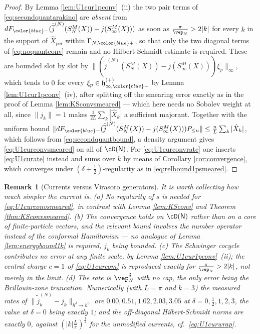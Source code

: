 \documentclass[a4paper, 11pt]{article}
\newcommand{\fh}{\mathfrak{h}}
\DeclareMathOperator{\1}{\mathds{1}}
\DeclareMathOperator{\per}{per}
\newtheorem{rem}[thm]{Remark}
\newcommand{\Nop}{\mathsf{N}}
\begin{document}
\begin{proof}
By Lemma \ref{lem:U1cur1pconv}\!\ (ii) the two pair terms of \eqref{eq:secondquantarakino} are \emph{absent} from $dF_{{\color{blue}-}}(\tilde{\overline{j}}^{(N)}(S^{M}_{N}(X))-j(S^{M}_{\infty}(X)))$ as soon as $\tfrac{\pi}{\vep_{N}}>2|k|$ for every $k$ in the support of $\hat{X}_{\per}$ within $\Gamma_{N,{\color{blue}+}}$, so that only the two diagonal terms of \eqref{eq:noquantconv} remain and no Hilbert-Schmidt estimate is required. These are bounded slot by slot by $\|(\tilde{\overline{j}}^{(N)}(S^{M}_{N}(X))-j(S^{M}_{\infty}(X)))\xi_{p}\|_{\infty}$, which tends to $0$ for every $\xi_{p}\in\fh^{(+)}_{\infty,{\color{blue}-}}$ by Lemma \ref{lem:U1cur1pconv}\!\ (iv), after splitting off the smearing error exactly as in the proof of Lemma \ref{lem:KSconvsmeared} --- which here needs no Sobolev weight at all, since $\|j_{k}\|=1$ makes $\tfrac{1}{2L}\sum_{k}|\hat{X}_{k}|$ a sufficient majorant. Together with the uniform bound $\|dF_{{\color{blue}-}}(\tilde{\overline{j}}^{(N)}(S^{M}_{N}(X))-j(S^{M}_{\infty}(X)))P_{\leq n}\|\leq \tfrac{n}{L}\sum_{k}|\hat{X}_{k}|$, which follows from \eqref{eq:secondquantbound}, a density argument gives \eqref{eq:U1curconvsmeared} on all of $\cD(\Nop)$. For \eqref{eq:U1curconvrate} one inserts \eqref{eq:U1curate} instead and sums over $k$ by means of Corollary \ref{cor:convergence}, which converges under $(\delta+\tfrac{1}{2})$-regularity as in \eqref{eq:relbound1psmeared}.
\end{proof}
\begin{rem}[Currents versus Virasoro generators]
\label{rem:U1curvsvira}
It is worth collecting how much simpler the current is. \emph{(a)} No regularity of $s$ is needed for \eqref{eq:U1curconvsmeared}, in contrast with Lemma \ref{lem:KSconv} and Theorem \ref{thm:KSconvsmeared}. \emph{(b)} The convergence holds on $\cD(\Nop)$ rather than on a core of finite-particle vectors, and the relevant bound involves the number operator instead of the conformal Hamiltonian --- no analogue of Lemma \ref{lem:energybound1k} is required, $j_{k}$ being bounded. \emph{(c)} The Schwinger cocycle contributes no error at any finite scale, by Lemma \ref{lem:U1cur1pconv}\!\ (ii); the central charge $c=1$ of \eqref{eq:U1curcom} is reproduced exactly for $\tfrac{\pi}{\vep_{N}}>2|k|$, not merely in the limit. \emph{(d)} The rate is $\vep_{N}^{\delta}$ with no cap, the only error being the Brillouin-zone truncation. Numerically (with $L=\pi$ and $k=3$) the measured rates of $\|\tilde{\overline{j}}^{(N)}_{k}-j_{k}\|_{h^{\delta}\rightarrow h^{0}}$ are $0.00, 0.51, 1.02, 2.03, 3.05$ at $\delta = 0,\tfrac{1}{2},1,2,3$, the value at $\delta=0$ being exactly $1$; and the off-diagonal Hilbert-Schmidt norms are exactly $0$, against $(|k|\tfrac{L}{\pi})^{\frac{1}{2}}$ for the unmodified currents, cf.~\eqref{eq:U1curwrap}.
\end{rem}
\end{document}
